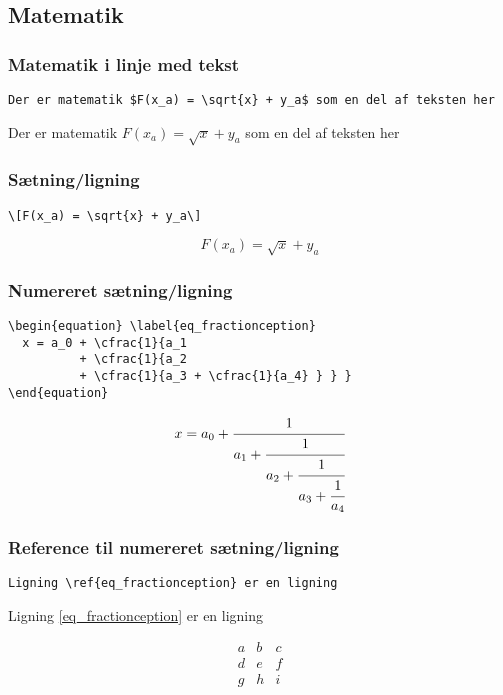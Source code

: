 \subsection{Matematik}

\subsubsection{Matematik i linje med tekst}
\begin{verbatim}
Der er matematik $F(x_a) = \sqrt{x} + y_a$ som en del af teksten her
\end{verbatim}
Der er matematik $F(x_a) = \sqrt{x} + y_a$ som en del af teksten her

\subsubsection{Sætning/ligning}
\begin{verbatim}
\[F(x_a) = \sqrt{x} + y_a\]
\end{verbatim}
\[F(x_a) = \sqrt{x} + y_a\]

\subsubsection{Numereret sætning/ligning}
\begin{verbatim}
\begin{equation} \label{eq_fractionception}
  x = a_0 + \cfrac{1}{a_1 
          + \cfrac{1}{a_2 
          + \cfrac{1}{a_3 + \cfrac{1}{a_4} } } }
\end{equation}
\end{verbatim}

\begin{equation} \label{eq_fractionception}
  x = a_0 + \cfrac{1}{a_1 
          + \cfrac{1}{a_2 
          + \cfrac{1}{a_3 + \cfrac{1}{a_4} } } }
\end{equation}

\subsubsection{Reference til numereret sætning/ligning}
\begin{verbatim}
Ligning \ref{eq_fractionception} er en ligning
\end{verbatim}

Ligning \ref{eq_fractionception} er en ligning

\[
 \begin{matrix}
  a & b & c \\
  d & e & f \\
  g & h & i
 \end{matrix}
\]